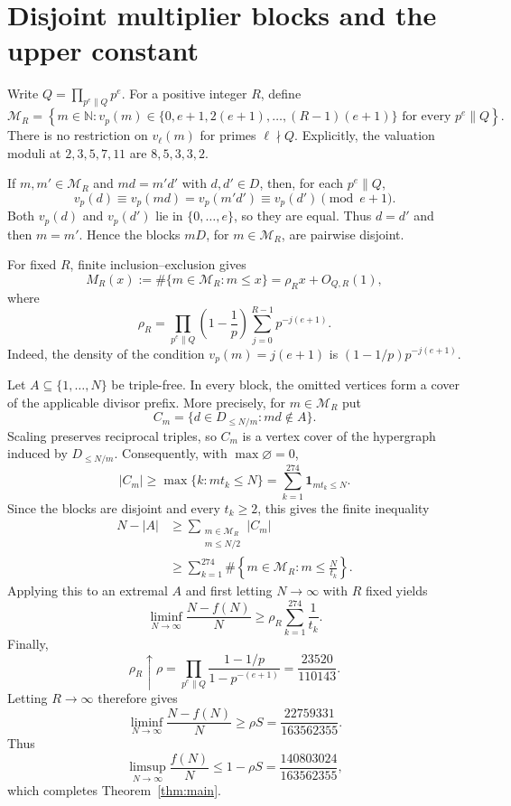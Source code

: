 \documentclass[11pt]{article}
\theoremstyle{definition}
\theoremstyle{plain}
\newcommand{\N}{\mathbb N}
\begin{document}
\section{Disjoint multiplier blocks and the upper constant}

Write $Q=\prod_{p^e\parallel Q}p^e$.  For a positive integer $R$, define
\[
 \mathcal M_R=
 \left\{
 m\in\N:
 v_p(m)\in\{0,e+1,2(e+1),\ldots,(R-1)(e+1)\}
 \text{ for every }p^e\parallel Q
 \right\}.
\]
There is no restriction on $v_\ell(m)$ for primes $\ell\nmid Q$.  Explicitly,
the valuation moduli at $2,3,5,7,11$ are $8,5,3,3,2$.

If $m,m'\in\mathcal M_R$ and $md=m'd'$ with $d,d'\in D$, then, for each
$p^e\parallel Q$,
\[
 v_p(d)\equiv v_p(md)=v_p(m'd')\equiv v_p(d')\pmod{e+1}.
\]
Both $v_p(d)$ and $v_p(d')$ lie in $\{0,\ldots,e\}$, so they are equal.
Thus $d=d'$ and then $m=m'$.  Hence the blocks $mD$, for
$m\in\mathcal M_R$, are pairwise disjoint.

For fixed $R$, finite inclusion--exclusion gives
\[
 M_R(x):=\#\{m\in\mathcal M_R:m\leq x\}
       =\rho_Rx+O_{Q,R}(1),
\]
where
\[
 \rho_R=
 \prod_{p^e\parallel Q}
 \left(1-\frac1p\right)
 \sum_{j=0}^{R-1}p^{-j(e+1)}.
\]
Indeed, the density of the condition $v_p(m)=j(e+1)$ is
$(1-1/p)p^{-j(e+1)}$.

Let $A\subseteq\{1,\ldots,N\}$ be triple-free.  In every block, the omitted
vertices form a cover of the applicable divisor prefix.  More precisely, for
$m\in\mathcal M_R$ put
\[
 C_m=\{d\in D_{\leq N/m}:md\notin A\}.
\]
Scaling preserves reciprocal triples, so $C_m$ is a vertex cover of the
hypergraph induced by $D_{\leq N/m}$.  Consequently, with
$\max\varnothing=0$,
\[
 |C_m|\geq\max\{k:mt_k\leq N\}
       =\sum_{k=1}^{274}\mathbf 1_{mt_k\leq N}.
\]
Since the blocks are disjoint and every $t_k\geq2$, this gives the finite
inequality
\[
 \begin{aligned}
 N-|A|
 &\geq
 \sum_{\substack{m\in\mathcal M_R\\m\leq N/2}}|C_m| \\
 &\geq
 \sum_{k=1}^{274}
 \#\left\{m\in\mathcal M_R:m\leq\frac{N}{t_k}\right\}.
 \end{aligned}
\]
Applying this to an extremal $A$ and first letting $N\to\infty$ with $R$
fixed yields
\[
 \liminf_{N\to\infty}\frac{N-f(N)}N
 \geq\rho_R\sum_{k=1}^{274}\frac1{t_k}.
\]
Finally,
\[
 \rho_R\mathrel{\uparrow}
 \rho=\prod_{p^e\parallel Q}
       \frac{1-1/p}{1-p^{-(e+1)}}
     =\frac{23520}{110143}.
\]
Letting $R\to\infty$ therefore gives
\[
 \liminf_{N\to\infty}\frac{N-f(N)}N
 \geq \rho S
 =\frac{22759331}{163562355}.
\]
Thus
\[
 \limsup_{N\to\infty}\frac{f(N)}N
 \leq1-\rho S
 =\frac{140803024}{163562355},
\]
which completes Theorem~\ref{thm:main}.
\end{document}

